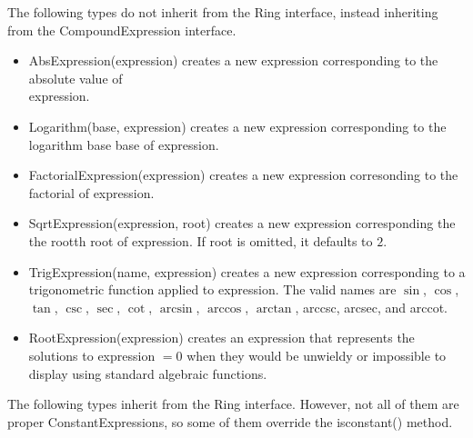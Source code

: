 \documentclass{article}
\begin{document}
The following types do not inherit from the {\ttfamily Ring} interface, instead inheriting from the {\ttfamily CompoundExpression} interface.

\begin{itemize}
    \item {\ttfamily AbsExpression(expression)} creates a new expression corresponding to the absolute value of \\ {\ttfamily expression}.
    \item {\ttfamily Logarithm(base, expression)} creates a new expression corresponding to the logarithm base {\ttfamily base} of {\ttfamily expression}.
    \item {\ttfamily FactorialExpression(expression)} creates a new expression corresonding to the factorial of {\ttfamily expression}.
    \item {\ttfamily SqrtExpression(expression, root)} creates a new expression corresponding the the {\ttfamily root}th root of {\ttfamily expression}. If {\ttfamily root} is omitted, it defaults to $2$.
    \item {\ttfamily TrigExpression(name, expression)} creates a new expression corresponding to a trigonometric function applied to {\ttfamily expression}. The valid names are $\sin$, $\cos$, $\tan$, $\csc$, $\sec$, $\cot$, $\arcsin$, $\arccos$, $\arctan$, arccsc, arcsec, and arccot.
    
    \item {\ttfamily RootExpression(expression)} creates an expression that represents the solutions to {\ttfamily expression} $= 0$ when they would be unwieldy or impossible to display using standard algebraic functions.
\end{itemize}


The following types inherit from the {\ttfamily Ring} interface. However, not all of them are proper {\ttfamily ConstantExpression}s, so some of them override the {\ttfamily isconstant()} method.
\end{document}
